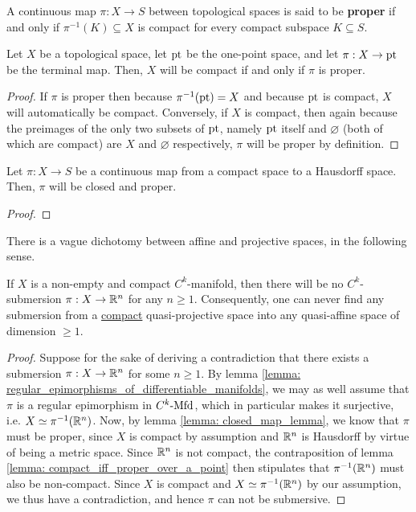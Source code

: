         \begin{definition} \label{def: proper_maps}
            A continuous map $\pi: X \to S$ between topological spaces is said to be \textbf{proper} if and only if $\pi^{-1}(K) \subseteq X$ is compact for every compact subspace $K \subseteq S$.
        \end{definition}
        \begin{lemma} \label{lemma: compact_iff_proper_over_a_point}
            Let $X$ be a topological space, let $\mathrm{pt}$ be the one-point space, and let $\pi: X \to \mathrm{pt}$ be the terminal map. Then, $X$ will be compact if and only if $\pi$ is proper.
        \end{lemma}
            \begin{proof}
                If $\pi$ is proper then because $\pi^{-1}(\mathrm{pt}) = X$ and because $\mathrm{pt}$ is compact, $X$ will automatically be compact. Conversely, if $X$ is compact, then again because the preimages of the only two subsets of $\mathrm{pt}$, namely $\mathrm{pt}$ itself and $\varnothing$ (both of which are compact) are $X$ and $\varnothing$ respectively, $\pi$ will be proper by definition.
            \end{proof}
        \begin{lemma} \label{lemma: closed_map_lemma}
            Let $\pi: X \to S$ be a continuous map from a compact space to a Hausdorff space. Then, $\pi$ will be closed and proper.
        \end{lemma}
            \begin{proof}
            \end{proof}
        There is a vague dichotomy between affine and projective spaces, in the following sense.
        \begin{theorem} \label{theorem: compact_differentiable_manifolds_do_not_submerge}
            If $X$ is a non-empty and compact $C^k$-manifold, then there will be no $C^k$-submersion $\pi: X \to \mathbb{R}^n$ for any $n \geq 1$. Consequently, one can never find any submersion from a \underline{compact} quasi-projective space into any quasi-affine space of dimension $\geq 1$.
        \end{theorem}
            \begin{proof}
                Suppose for the sake of deriving a contradiction that there exists a submersion $\pi: X \to \mathbb{R}^n$ for some $n \geq 1$. By lemma \ref{lemma: regular_epimorphisms_of_differentiable_manifolds}, we may as well assume that $\pi$ is a regular epimorphism in $C^k\text{-}\mathrm{Mfd}$, which in particular makes it surjective, i.e. $X \simeq \pi^{-1}(\mathbb{R}^n)$. Now, by lemma \ref{lemma: closed_map_lemma}, we know that $\pi$ must be proper, since $X$ is compact by assumption and $\mathbb{R}^n$ is Hausdorff by virtue of being a metric space. Since $\mathbb{R}^n$ is not compact, the contraposition of lemma \ref{lemma: compact_iff_proper_over_a_point} then stipulates that $\pi^{-1}(\mathbb{R}^n)$ must also be non-compact. Since $X$ is compact and $X \simeq \pi^{-1}(\mathbb{R}^n)$ by our assumption, we thus have a contradiction, and hence $\pi$ can not be submersive. 
            \end{proof}
